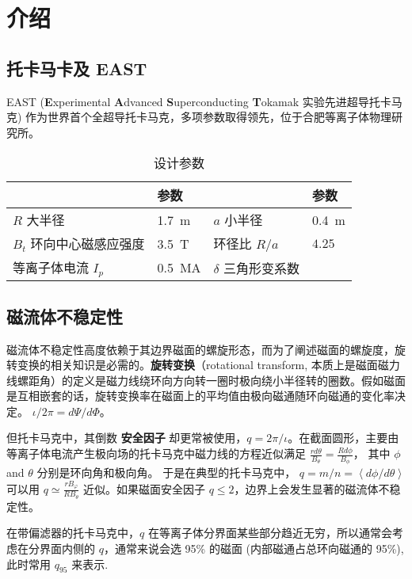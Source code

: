 \chapter{介绍}

\section{托卡马卡及 EAST}
EAST (\textbf{E}xperimental \textbf{A}dvanced \textbf{S}uperconducting \textbf{T}okamak 实验先进超导托卡马克) 作为世界首个全超导托卡马克，多项参数取得领先，位于合肥等离子体物理研究所。

\begin{table}[htb]
    \centering
    \caption{\east 设计参数}
    \label{tab:east_parameter}
    \begin{tabularx}{\linewidth}{lXlX}
        \toprule[1.5pt]
         & 参数 & & 参数\\
        \midrule[1pt]
        $R$ 大半径 &  \SI{1.7}{\meter} & $a$ 小半径 & \SI{0.4}{\meter}\\ 
        $B_t$ 环向中心磁感应强度 &  \SI{3.5}{\tesla} & 环径比 $R/a$ & $4.25$\\ 
        等离子体电流 $I_p$ & \SI{0.5}{\mega\ampere}& $\delta$ 三角形变系数 &\\ 
        \bottomrule[1.5pt]
    \end{tabularx}
\end{table}




\section{磁流体不稳定性}
磁流体不稳定性高度依赖于其边界磁面的螺旋形态，而为了阐述磁面的螺旋度，旋转变换的相关知识是必需的。\textbf{旋转变换}（rotational transform, 本质上是磁面磁力线螺距角）的定义是磁力线绕环向方向转一圈时极向绕小半径转的圈数。假如磁面是互相嵌套的话，旋转变换率在磁面上的平均值由极向磁通随环向磁通的变化率决定。
$ \iota/2 \pi = d\Psi /d \Phi $。

但托卡马克中，其倒数 \textbf{安全因子} 却更常被使用，$q = 2\pi/\iota$。在截面圆形，主要由等离子体电流产生极向场的托卡马克中磁力线的方程近似满足 $ \frac{r d\theta}{B_\theta} = \frac{Rd\phi}{B_\phi} $，
其中 $ \phi $ and $\theta$ 分别是环向角和极向角。 于是在典型的托卡马克中， $ q = m/n = \left \langle d\phi /d\theta \right \rangle $ 可以用 $ q \simeq \frac{r B_\varphi}{R B_\theta} $ 近似。如果磁面安全因子 $q\leq 2$，边界上会发生显著的磁流体不稳定性。

在带偏滤器的托卡马克中，$q$ 在等离子体分界面某些部分趋近无穷，所以通常会考虑在分界面内侧的 $q$，通常来说会选 95\% 的磁面 (内部磁通占总环向磁通的 95\%), 此时常用 $q_{95}$ 来表示.






